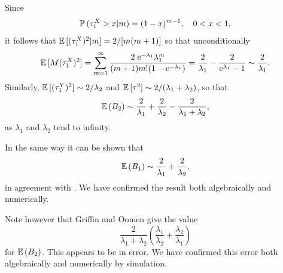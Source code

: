 Since 
$$\mathbb{P}\,(\tau_1^X > x|m) = (1-x)^{m-1}, \quad 0<x<1,$$
it follows that $\mathbb{E}\,[(\tau_1^X)^2| m] = 2/[m(m+1)]$ so that unconditionally 
$$\mathbb{E}\,[M (\tau_1^X)^2] = \sum_{m=1}^\infty \frac{2\; \text{e}^{-\lambda_1}\lambda^m_1}{ (m+1) m! (1 - \text{e}^{-\lambda_1})} =\frac{2}{\lambda_1} - \frac{2}{\text{e}^{\lambda_1} -1} \sim \frac{2}{\lambda_1}. $$  
Similarly, $\mathbb{E}\,[(\tau_1^Y)^2] \sim 2/\lambda_2$ and $\mathbb{E}\,[\tau^2] \sim 2/(\lambda_1+\lambda_2)$, so that
\begin{equation}\label{eq:expB2}\mathbb{E}\,(B_2) \sim \frac{2}{\lambda_1} + \frac{2}{\lambda_2} - \frac{2}{\lambda_1 + \lambda_2},\end{equation}
as $\lambda_1$ and $\lambda_2$ tend to infinity. 

In the same way it can be shown that
\begin{equation}\label{eq:expB1}
\mathbb{E}\,(B_1) \sim \frac{2}{\lambda_1} + \frac{2}{\lambda_2}.\end{equation}
in agreement with \citet{griffin2011covariance}. We have confirmed the result both algebraically and
numerically.

Note however that Griffin and Oomen give the value 
$$ \frac{2}{{\lambda_1 + \lambda_2}}\left(\frac{\lambda_1}{\lambda_2} + \frac{\lambda_2}{\lambda_1}\right)$$ for $\mathbb{E}\,(B_2)$. This appears to be in error. We have confirmed this error both algebraically and numerically by simulation.

